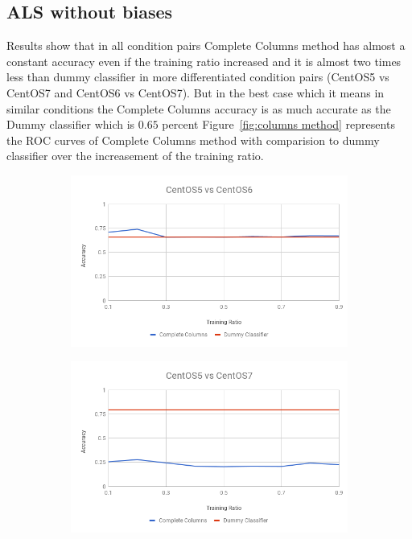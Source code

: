 \documentclass[10pt, conference, compsocconf]{IEEEtran}
\begin{document}
\subsection{ALS without biases}
Results show that in all condition pairs Complete Columns method has 
almost a constant accuracy even if the training ratio increased and it 
is almost two times less than dummy classifier in more differentiated 
condition pairs (CentOS5 vs CentOS7 and CentOS6 vs CentOS7). But in the 
best case which it means in similar conditions the Complete Columns 
accuracy is as much accurate as the Dummy classifier which is $0.65$ 
percent Figure~\ref{fig:columns method} represents
the ROC curves of Complete Columns method with comparision to dummy 
classifier over the increasement of the training ratio.
\begin{figure}[h!]
        \centering
        \begin{subfigure}[b]{0.3\linewidth}
                \includegraphics[width=\columnwidth]{figures/columns_5vs6}
        \end{subfigure}
        \begin{subfigure}[b]{0.3\linewidth}
                \includegraphics[width=\columnwidth]{figures/columns_5vs7}

\end{subfigure}
\end{figure}
\end{document}
